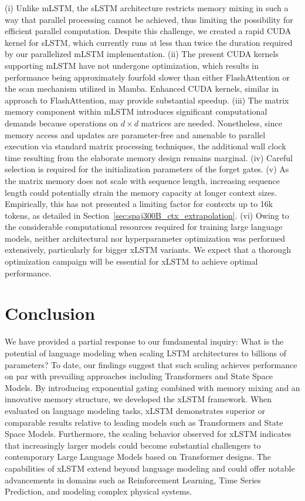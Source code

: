 (i) Unlike mLSTM, the sLSTM architecture restricts memory mixing in such a way that parallel processing cannot be achieved, thus limiting the possibility for efficient parallel computation. Despite this challenge, we created a rapid CUDA kernel for sLSTM, which currently runs at less than twice the duration required by our parallelized mLSTM implementation. (ii) The present CUDA kernels supporting mLSTM have not undergone optimization, which results in performance being approximately fourfold slower than either FlashAttention or the scan mechanism utilized in Mamba. Enhanced CUDA kernels, similar in approach to FlashAttention, may provide substantial speedup. (iii) The matrix memory component within mLSTM introduces significant computational demands because operations on $d \times d$ matrices are needed. Nonetheless, since memory access and updates are parameter-free and amenable to parallel execution via standard matrix processing techniques, the additional wall clock time resulting from the elaborate memory design remains marginal. (iv) Careful selection is required for the initialization parameters of the forget gates. (v) As the matrix memory does not scale with sequence length, increasing sequence length could potentially strain the memory capacity at longer context sizes. Empirically, this has not presented a limiting factor for contexts up to 16k tokens, as detailed in Section~\ref{sec:spaj300B_ctx_extrapolation}. (vi) Owing to the considerable computational resources required for training large language models, neither architectural nor hyperparameter optimization was performed extensively, particularly for bigger xLSTM variants. We expect that a thorough optimization campaign will be essential for xLSTM to achieve optimal performance.

\section{Conclusion}
We have provided a partial response to our fundamental inquiry: What is the potential of language modeling when scaling LSTM architectures to billions of parameters? To date, our findings suggest that such scaling achieves performance on par with prevailing approaches including Transformers and State Space Models. By introducing exponential gating combined with memory mixing and an innovative memory structure, we developed the xLSTM framework. When evaluated on language modeling tasks, xLSTM demonstrates superior or comparable results relative to leading models such as Transformers and State Space Models. Furthermore, the scaling behavior observed for xLSTM indicates that increasingly larger models could become substantial challengers to contemporary Large Language Models based on Transformer designs. The capabilities of xLSTM extend beyond language modeling and could offer notable advancements in domains such as Reinforcement Learning, Time Series Prediction, and modeling complex physical systems.

